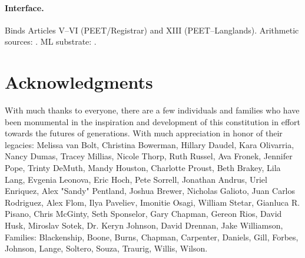 \documentclass[12pt]{amsart}
\theoremstyle{plain}
\begin{document}
\paragraph{Interface.} Binds Articles V–VI (PEET/Registrar) and XIII (PEET–Langlands). Arithmetic sources: \cite{sturm1987congruence,diamond2005first,deligne1971formes,clozel2008satotate,barnet2011st,katz1999random,langlands1970problems,harris2001geometry}. ML substrate: \cite{vaswani2017attention,bradbury2018jax}.

\newpage
\section*{Acknowledgments}

With much thanks to everyone, there are a few individuals and families who have been monumental in the inspiration and development of this constitution in effort towards the futures of generations. With much appreciation in honor of their legacies: Melissa van Bolt, Christina Bowerman, Hillary Daudel, Kara Olivarria, Nancy Dumas, Tracey Millias, Nicole Thorp, Ruth Russel, Ava Fronek, Jennifer Pope, Trinty DeMuth, Mandy Houston, Charlotte Proust, Beth Brakey, Lila Lang, Evgenia Leonova, Eric Hoch, Pete Sorrell, Jonathan Andrus, Uriel Enriquez, Alex "Sandy" Pentland, Joshua Brewer, Nicholas Galioto, Juan Carlos Rodriguez, Alex Flom, Ilya Paveliev, Imonitie Osagi, William Stetar, Gianluca R. Pisano, Chris McGinty, Seth Sponselor, Gary Chapman, Gereon Rios, David Husk, Miroslav Sotek, Dr. Keryn Johnson, David Drennan, Jake Williamson,  Families: Blackenship, Boone, Burns, Chapman, Carpenter, Daniels, Gill, Forbes, Johnson, Lange, Soltero, Souza, Traurig, Willis, Wilson. 



\clearpage
\end{document}

